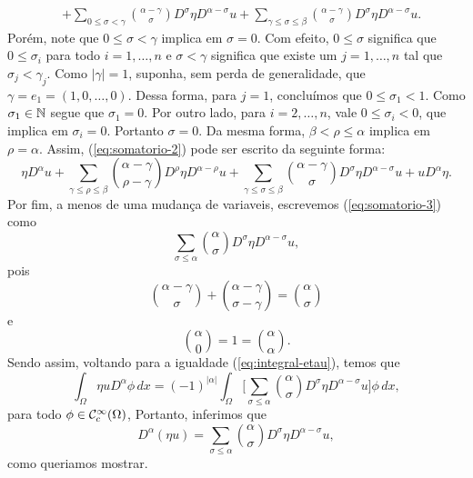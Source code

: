 \begin{prf}
\begin{equation}
\begin{aligned}
            &+ \sum_{0 \leqslant \sigma < \gamma} \binom{\alpha - \gamma}{\sigma} D^{\sigma} \eta D^{\alpha - \sigma} u + \sum_{\gamma \leqslant \sigma \leqslant \beta} \binom{\alpha - \gamma}{\sigma} D^{\sigma} \eta D^{\alpha - \sigma} u.
           \end{aligned}
    \end{equation}
    Porém, note que $0 \leqslant \sigma < \gamma$ implica em $\sigma = 0$. Com efeito, $0 \leqslant \sigma$ significa que $0 \leqslant \sigma_i$ para todo $i = 1,\dots,n$ e $\sigma < \gamma$ significa que existe um $j = 1,\dots,n$ tal que $\sigma_j < \gamma_j$. Como $|\gamma| = 1$, suponha, sem perda de generalidade, que $\gamma = e_1 = (1,0,\dots,0)$.
    Dessa forma, para $j = 1$, concluímos que $0 \leqslant \sigma_1 < 1$.
    Como $\sigma_1 \in \mathbb{N}$ segue que $\sigma_1 = 0$. Por outro lado, para $i = 2,\dots,n$, vale $0 \leqslant \sigma_i < 0$,
    que implica em $\sigma_i = 0$. Portanto $\sigma = 0$.
    Da mesma forma, $\beta < \rho \leqslant \alpha$ implica em $\rho =\alpha$.
    Assim, (\ref{eq:somatorio-2}) pode ser escrito da seguinte forma:
    \begin{equation} \label{eq:somatorio-3}
        \eta D^{\alpha} u + \sum_{\gamma \leqslant \rho \leqslant \beta} \binom{\alpha - \gamma}{\rho - \gamma} D^{\rho}\eta D^{\alpha - \rho} u + \sum_{\gamma \leqslant \sigma \leqslant \beta} \binom{\alpha - \gamma}{\sigma} D^{\sigma} \eta D^{\alpha - \sigma} u + 
        u D^{\alpha}\eta.
    \end{equation}
    Por fim, a menos de uma mudança de variaveis, escrevemos (\ref{eq:somatorio-3}) como
    \[
        \sum_{\sigma \leqslant \alpha} \binom{\alpha}{\sigma} D^{\sigma} \eta D^{\alpha - \sigma} u,
    \]
    pois
    \[
        \binom{\alpha - \gamma}{\sigma} + \binom{\alpha - \gamma}{\sigma - \gamma} = \binom{\alpha}{\sigma}
    \]
    e
    \[
        \binom{\alpha}{0} = 1 = \binom{\alpha}{\alpha}.
    \]
    Sendo assim, voltando para a igualdade (\ref{eq:integral-etau}), temos que
    \[
        \int_\Omega \eta u D^{\alpha}\phi \, dx = (-1)^{|\alpha|} \int_\Omega \bigg[\sum_{\sigma \leqslant \alpha} \binom{\alpha}{\sigma} D^{\sigma} \eta D^{\alpha - \sigma} u\bigg] \phi \,dx,
    \]
    para todo $\phi \in \mathcal{C}^{\infty}_c(\Omega)$,
    Portanto, inferimos que
    \[
        D^\alpha (\eta u) = \sum_{\sigma \leqslant \alpha} \binom{\alpha}{\sigma} D^{\sigma} \eta D^{\alpha - \sigma} u,
    \]
    como queriamos mostrar.
\end{prf}

